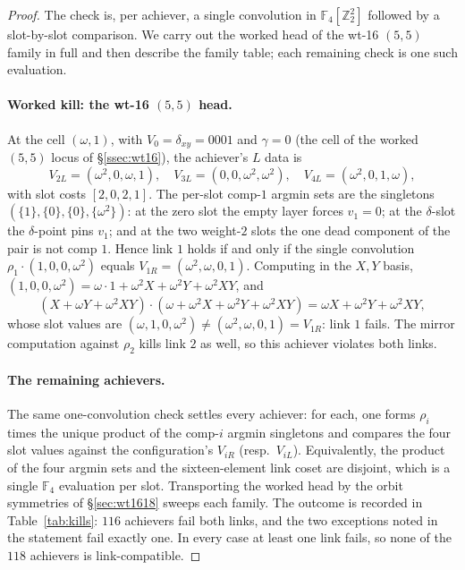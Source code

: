 \documentclass[11pt]{article}
\newcommand{\Z}{\mathbb{Z}}
\newcommand{\F}[1]{\mathbb{F}_{#1}}
\theoremstyle{plain}
\theoremstyle{definition}
\theoremstyle{remark}
\begin{document}
\begin{proof}
The check is, per achiever, a single convolution in $\F4[\Z_2^2]$ followed by a slot-by-slot
comparison. We carry out the worked head of the wt-16 $(5,5)$ family in full and then describe
the family table; each remaining check is one such evaluation.

\paragraph{Worked kill: the wt-16 $(5,5)$ head.}
At the cell $(\omega,1)$, with $V_0=\delta_{xy}=0001$ and $\gamma=0$ (the cell of the worked
$(5,5)$ locus of \S\ref{ssec:wt16}), the achiever's $L$ data is
\[
  V_{2L}=(\omega^2,0,\omega,1),\quad V_{3L}=(0,0,\omega^2,\omega^2),\quad V_{4L}=(\omega^2,0,1,\omega),
\]
with slot costs $[2,0,2,1]$. The per-slot comp-$1$ argmin sets are the singletons
$(\{1\},\{0\},\{0\},\{\omega^2\})$: at the zero slot the empty layer forces $v_1=0$; at the
$\delta$-slot the $\delta$-point pins $v_1$; and at the two weight-$2$ slots the one dead
component of the pair is not comp $1$. Hence link $1$ holds if and only if the single
convolution $\rho_1\cdot(1,0,0,\omega^2)$ equals $V_{1R}=(\omega^2,\omega,0,1)$. Computing in
the $X,Y$ basis, $(1,0,0,\omega^2)=\omega\cdot 1+\omega^2 X+\omega^2 Y+\omega^2 XY$, and
\[
  (X+\omega Y+\omega^2 XY)\cdot(\omega+\omega^2 X+\omega^2 Y+\omega^2 XY)=\omega X+\omega^2 Y+\omega^2 XY,
\]
whose slot values are $(\omega,1,0,\omega^2)\ne(\omega^2,\omega,0,1)=V_{1R}$: link $1$ fails.
The mirror computation against $\rho_2$ kills link $2$ as well, so this achiever violates both
links.

\paragraph{The remaining achievers.}
The same one-convolution check settles every achiever: for each, one forms $\rho_i$ times the
unique product of the comp-$i$ argmin singletons and compares the four slot values against the
configuration's $V_{iR}$ (resp.\ $V_{iL}$). Equivalently, the product of the four argmin sets
and the sixteen-element link coset are disjoint, which is a single $\F4$ evaluation per slot.
Transporting the worked head by the orbit symmetries of \S\ref{sec:wt1618} sweeps each family.
The outcome is recorded in Table~\ref{tab:kills}: $116$ achievers fail both links, and the two
exceptions noted in the statement fail exactly one. In every case at least one link fails, so
none of the $118$ achievers is link-compatible.
\end{proof}
\end{document}
